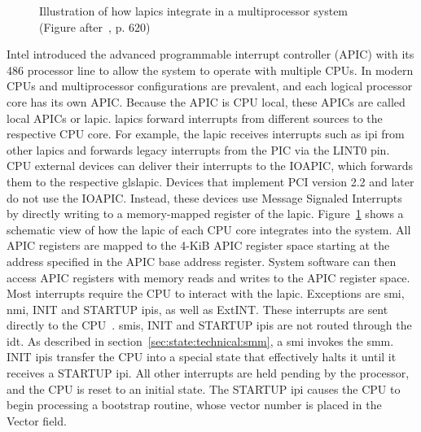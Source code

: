 
\begin{figure}
  \begin{center}
    
    \caption{Illustration of how \glspl{lapic} integrate in a
    multiprocessor system (Figure after~\cite{amd_manual}, p. 620)}
    \label{fig:state:technical:lapic}
  \end{center}
\end{figure}

Intel introduced the advanced programmable interrupt controller (APIC) with its
486 processor line to allow the system to operate with multiple CPUs. In modern
CPUs and multiprocessor configurations are prevalent, and each logical processor
core has its own APIC. Because the APIC is CPU local, these APICs are called
local APICs or \gls{lapic}. \glspl{lapic} forward interrupts from different
sources to the respective CPU core. For example, the \gls{lapic} receives
interrupts such as \gls{ipi} from other \glspl{lapic} and forwards legacy
interrupts from the PIC via the LINT0 pin. CPU external devices can deliver
their interrupts to the IOAPIC, which forwards them to the respective
gls{lapic}. Devices that implement PCI version 2.2 and later do not use the
IOAPIC. Instead, these devices use Message Signaled Interrupts by directly
writing to a memory-mapped register of the \gls{lapic}.
Figure~\ref{fig:state:technical:lapic} shows a schematic view of how the
\gls{lapic} of each CPU core integrates into the system. All APIC registers are
mapped to the 4-KiB APIC register space starting at the address specified in the
APIC base address register. System software can then access APIC registers with
memory reads and writes to the APIC register space. Most interrupts require the
CPU to interact with the \gls{lapic}. Exceptions are \gls{smi}, \gls{nmi}, INIT
and STARTUP \glspl{ipi}, as well as ExtINT. These interrupts are sent directly
to the CPU~\cite{amd_manual, intel_sdm}. \glspl{smi}, INIT and STARTUP
\glspl{ipi} are not routed through the \gls{idt}. As described in
section~\ref{sec:state:technical:smm}, a \gls{smi} invokes the \gls{smm}. INIT
\glspl{ipi} transfer the CPU into a special state that effectively halts it
until it receives a STARTUP \gls{ipi}. All other interrupts are held pending by
the processor, and the CPU is reset to an initial state. The STARTUP \gls{ipi}
causes the CPU to begin processing a bootstrap routine, whose vector number is
placed in the Vector field.

